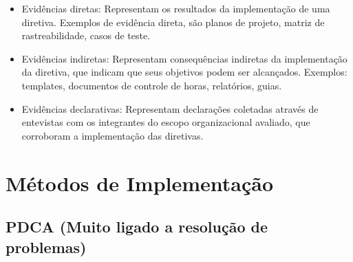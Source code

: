 \documentclass{article}
\begin{document}
	\begin{itemize}
	\item Evidências diretas: Representam os resultados da implementação de uma diretiva. Exemplos de evidência direta, são planos de projeto, matriz de rastreabilidade, casos de teste.
	\item Evidências indiretas: Representam consequências indiretas da implementação da diretiva, que indicam que seus objetivos podem ser alcançados. Exemplos: templates, documentos de controle de horas, relatórios, guias.
	\item Evidências declarativas: Representam declarações coletadas através de entevistas com os integrantes do escopo organizacional avaliado, que corroboram a implementação das diretivas.
	\end{itemize}

\section{Métodos de Implementação} \date{19/05/2014}
\subsection{PDCA (Muito ligado a resolução de problemas)}
\end{document}
